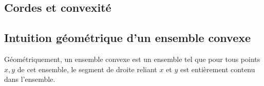 \documentclass{article}
\begin{document}

\subsection{Cordes et convexité}

\subsection{Intuition géométrique d'un ensemble convexe}
Géométriquement, un ensemble convexe est un ensemble tel que pour tous points $x, y$ de cet ensemble, le segment de droite reliant $x$ et $y$ est entièrement contenu dans l'ensemble.
\end{document}
